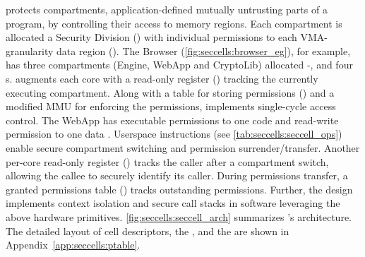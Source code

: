\seccells protects compartments, application-defined mutually untrusting
parts of a program, by controlling their access to memory regions.
Each compartment is allocated a Security Division (\secdiv)
with individual permissions to each VMA-granularity data region (\cell{}).
The Browser (\autoref{fig:seccells:browser_eg}), for example, has 
three compartments (Engine, WebApp and CryptoLib) allocated 
-, and four \cell{}s.
\seccells augments each core with a read-only register (\sid) tracking 
the currently executing compartment.
Along with a table for storing permissions (\ptable) and a modified
MMU for enforcing the permissions, \seccells implements single-cycle
access control.
The WebApp \secdiv has executable permissions
to one code \cell and read-write permission to one data \cell.
Userspace instructions (see \autoref{tab:seccells:seccell_ops}) enable 
secure compartment switching and permission surrender/transfer.
%
Another per-core read-only register (\rid) tracks the caller after a 
compartment switch, allowing the callee to securely identify 
its caller.
During permissions transfer, a granted permissions table (\gtable) tracks
outstanding permissions.
Further, the design implements context isolation and secure call stacks
in software leveraging the above hardware primitives.
\autoref{fig:seccells:seccell_arch} summarizes \seccells's architecture.
The detailed layout of cell descriptors, the \ptable, and the \gtable 
are shown in Appendix~\ref{app:seccells:ptable}.



